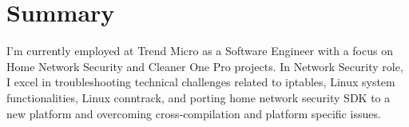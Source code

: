 \section{Summary}
I'm currently employed at Trend Micro as a Software Engineer with a focus on Home Network Security and Cleaner One Pro projects. In Network Security role, I excel in troubleshooting technical challenges related to iptables, Linux system functionalities, Linux conntrack, and porting home network security SDK to a new platform and overcoming cross-compilation and platform specific issues.
